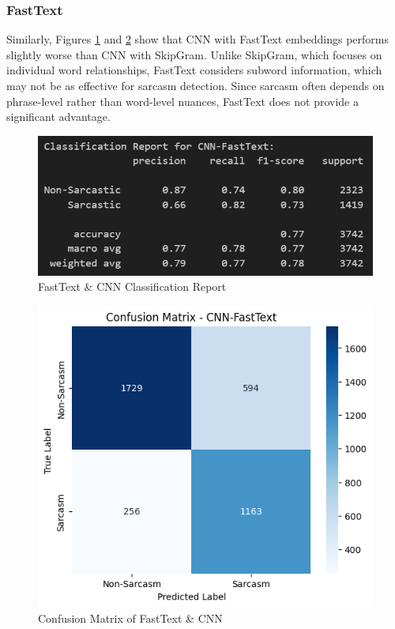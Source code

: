 \documentclass[11pt]{article}
\begin{document}
\subsubsection{FastText}
Similarly, Figures \ref{fig:ftcnncr} and \ref{fig:ftcnncm} show that CNN with FastText embeddings performs slightly worse than CNN with SkipGram. Unlike SkipGram, which focuses on individual word relationships, FastText considers subword information, which may not be as effective for sarcasm detection. Since sarcasm often depends on phrase-level rather than word-level nuances, FastText does not provide a significant advantage.
\begin{figure}[htbp]
    \centering
    \includegraphics[width=.8\linewidth]{pic/CNN-Fasttext-Report.png}
    \caption{FastText \& CNN Classification Report}
    \label{fig:ftcnncr}
\end{figure}
\begin{figure}[htbp]
    \centering
    \includegraphics[width=.8\linewidth]{pic/CNN-Fasttext-Matrix.png}
    \caption{Confusion Matrix of FastText \& CNN}
    \label{fig:ftcnncm}
\end{figure}

\end{document}
